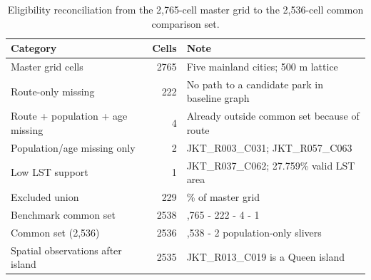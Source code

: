 ﻿\begin{table}[H]
\centering
\small
\caption{Eligibility reconciliation from the 2,765-cell master grid to the 2,536-cell common comparison set.}\label{tab:s9}
\begin{tabularx}{\textwidth}{@{}>{\raggedright\arraybackslash}p{7.0cm} r >{\raggedright\arraybackslash}X@{}}
\toprule
Category & Cells & Note \\
\midrule
Master grid cells & 2765 & Five mainland cities; 500 m lattice \\
Route-only missing & 222 & No path to a candidate park in baseline graph \\
Route + population + age missing & 4 & Already outside common set because of route \\
Population/age missing only & 2 & JKT\_R003\_C031; JKT\_R057\_C063 \\
Low LST support & 1 & JKT\_R037\_C062; 27.759\% valid LST area \\
Excluded union & 229 & 8.28\% of master grid \\
Benchmark common set & 2538 & 2,765 - 222 - 4 - 1 \\
Common set (2,536) & 2536 & 2,538 - 2 population-only slivers \\
Spatial observations after island & 2535 & JKT\_R013\_C019 is a Queen island \\
\bottomrule
\end{tabularx}
\end{table}
